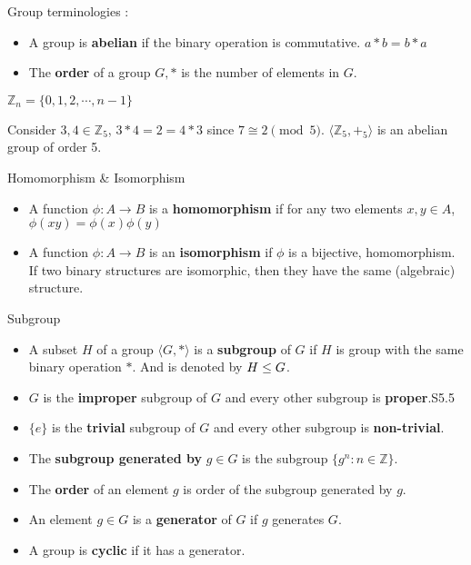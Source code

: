 \begin{definition}Group terminologies :
\begin{itemize}
	\item A group is \textbf{abelian} if the binary operation is commutative. $a \ast b = b \ast a$%
	\item The \textbf{order} of a group $G,\ast$ is the number of elements in $G$.%
\end{itemize}
\end{definition}

\begin{definition}
	$\mathbb{Z}_n = \{ 0, 1, 2, \cdots, n-1 \}$
\end{definition}

\begin{remark}
	Consider $3,4 \in \mathbb{Z}_5$,
	$3 \ast 4 = 2 = 4 \ast 3$ since $7 \cong 2 \pmod 5$.
	$\langle \mathbb{Z}_5,+_5 \rangle$ is an abelian group of order 5.
\end{remark}

\begin{definition} Homomorphism \& Isomorphism
\begin{itemize}
	\item A function $\phi : A \to B$ is a \textbf{homomorphism} if for any two elements $x,y \in A$, $\phi (xy) = \phi(x)\phi(y)$%
	\item A function $\phi : A \to B$ is an \textbf{isomorphism} if $\phi$ is a bijective, homomorphism.
	If two binary structures  are isomorphic, then they have the same (algebraic) structure.%
\end{itemize}
\end{definition}

\begin{definition} Subgroup
\begin{itemize}
	\item A subset $H$ of a group $\langle G,\ast \rangle$ is a \textbf{subgroup} of $G$ if $H$ is group with the same binary operation $\ast$.
	And is denoted by $H \le G$.%
	\item $G$ is the \textbf{improper} subgroup of $G$ and every other subgroup is \textbf{proper}.S5.5
	\item $\{e\}$ is the \textbf{trivial} subgroup of $G$ and every other subgroup is \textbf{non-trivial}.%
	\item The \textbf{subgroup generated by} $g \in G$ is the subgroup $\{ g^n : n \in \mathbb{Z} \}$.%
	\item The \textbf{order} of an element $g$ is order of the subgroup generated by $g$.%
	\item An element $g \in G$ is a \textbf{generator} of $G$ if $g$ generates $G$.%
	\item A group is \textbf{cyclic} if it has a generator.%
\end{itemize}
\end{definition}

